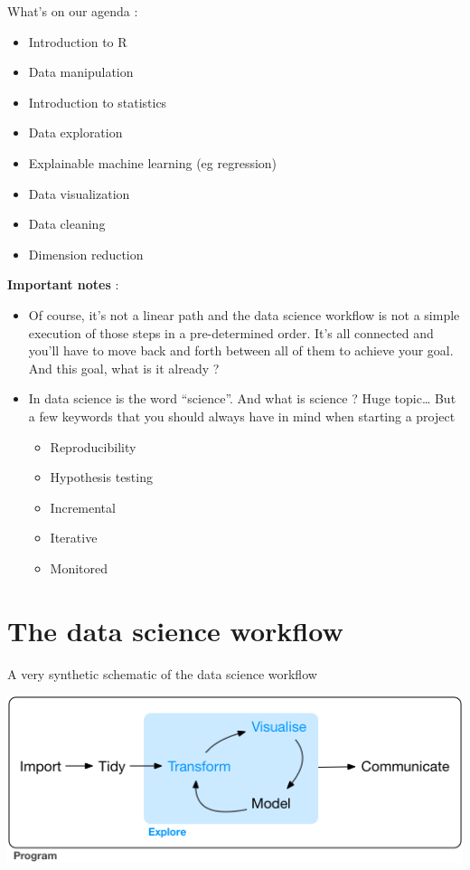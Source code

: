 \documentclass[
]{book}
\providecommand{\tightlist}{%
  \setlength{\itemsep}{0pt}\setlength{\parskip}{0pt}}
\begin{document}
What's on our agenda :

\begin{itemize}
\tightlist
\item
  Introduction to R
\item
  Data manipulation
\item
  Introduction to statistics
\item
  Data exploration
\item
  Explainable machine learning (eg regression)
\item
  Data visualization
\item
  Data cleaning
\item
  Dimension reduction
\end{itemize}

\textbf{Important notes} :

\begin{itemize}
\tightlist
\item
  Of course, it's not a linear path and the data science workflow is not a simple execution of those steps in a pre-determined order. It's all connected and you'll have to move back and forth between all of them to achieve your goal. And this goal, what is it already ?
\item
  In data science is the word ``science''. And what is science ? Huge topic\ldots{} But a few keywords that you should always have in mind when starting a project

  \begin{itemize}
  \tightlist
  \item
    Reproducibility
  \item
    Hypothesis testing
  \item
    Incremental
  \item
    Iterative
  \item
    Monitored
  \end{itemize}
\end{itemize}

\hypertarget{the-data-science-workflow}{%
\section{The data science workflow}\label{the-data-science-workflow}}

A very synthetic schematic of the data science workflow

\includegraphics{img/data-science-explore.png}
\end{document}
